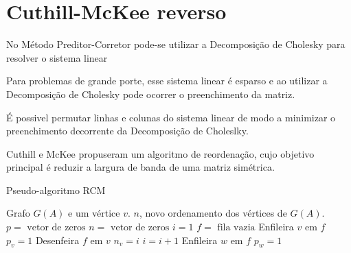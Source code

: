 % 
% 
% 

\section{Cuthill-McKee reverso}
No Método Preditor-Corretor pode-se utilizar a Decomposição de Cholesky para resolver o sistema linear

Para problemas de grande porte, esse sistema linear é esparso e ao utilizar a Decomposição de Cholesky pode ocorrer o preenchimento da matriz.

É possivel permutar linhas e colunas do sistema linear de modo a minimizar o preenchimento decorrente da Decomposição de Choleslky.

Cuthill e McKee \cite{Cuthill:1969:ReducingBandwidth} propuseram um algoritmo de reordenação, cujo objetivo principal é reduzir a largura de banda de uma matriz simétrica.

\begin{algorithm}
    \caption{Pseudo-algoritmo RCM}
    \label{alg:rcm}
    \begin{algorithmic}
        \REQUIRE Grafo $G(A)$ e um vértice $v$.
        \ENSURE $n$, novo ordenamento dos vértices de $G(A)$.
        \STATE $p = \text{ vetor de zeros}$
        \STATE $n = \text{ vetor de zeros}$
        \STATE $i = 1$
        \STATE $f = \text{ fila vazia}$
        \STATE Enfileira $v$ em $f$
        \STATE $p_v = 1$
            \STATE Desenfeira $f$ em $v$
            \STATE $n_v = i$
            \STATE $i = i + 1$
                    \STATE Enfileira $w$ em $f$
                    \STATE $p_w = 1$
                \ENDIF
            \ENDFOR
        \ENDWHILE
    \end{algorithmic}
\end{algorithm}
